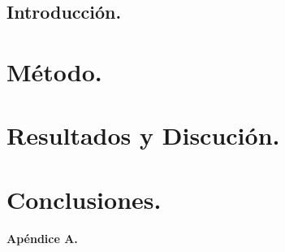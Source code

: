 \documentclass[a4paper,11pt]{extarticle} %
\begin{document}
\vspace{0.35em}



\begin{multicols}{2}
	\section{Introducción.}

	

\end{multicols}



\begin{multicols}{2}
	
	\section{Método.}

	

	\section{Resultados y Discución.}

	

	\section{Conclusiones.}

	

	\printbibliography[title={Referencias.}]

\end{multicols}


{\large \textbf{Apéndice A.}}

\end{document}
